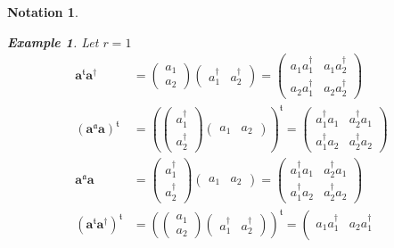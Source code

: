 \documentclass[aps, preprint]{revtex4}
\newtheorem{example}[theorem]{Example}
\newtheorem{notation}[theorem]{Notation}
\begin{document}
\begin{notation}
\begin{example}
Let $r =1$
\begin{align}\mathbf{a}^{\mathfrak{t}} \mathbf{a}^{ \dag } &  =\left (\begin{array}{c}a_{1} \\
a_{2}\end{array}\right ) \left (\begin{array}{cc}a_{1}^{ \dag } & a_{2}^{ \dag }\end{array}\right ) =\left (\begin{array}{cc}a_{1} a_{1}^{ \dag } & a_{1} a_{2}^{ \dag } \\
a_{2} a_{1}^{ \dag } & a_{2} a_{2}^{ \dag }\end{array}\right ) \\
\left (\mathbf{a}^{\mathfrak{a}} \mathbf{a}\right )^{\mathfrak{t}} &  =\left (\left (\begin{array}{c}a_{1}^{ \dag } \\
a_{2}^{ \dag }\end{array}\right ) \left (\begin{array}{cc}a_{1} & a_{2}\end{array}\right )\right )^{\mathfrak{t}} =\left (\begin{array}{cc}a_{1}^{ \dag } a_{1} & a_{2}^{ \dag } a_{1} \\
a_{1}^{ \dag } a_{2} & a_{2}^{ \dag } a_{2}\end{array}\right ) \\
\mathbf{a}^{\mathfrak{a}} \mathbf{a} &  =\left (\begin{array}{c}a_{1}^{ \dag } \\
a_{2}^{ \dag }\end{array}\right ) \left (\begin{array}{cc}a_{1} & a_{2}\end{array}\right ) =\left (\begin{array}{cc}a_{1}^{ \dag } a_{1} & a_{2}^{ \dag } a_{1} \\
a_{1}^{ \dag } a_{2} & a_{2}^{ \dag } a_{2}\end{array}\right ) \\
\left (\mathbf{a}^{\mathfrak{t}} \mathbf{a}^{ \dag }\right )^{\mathfrak{t}} &  =\left (\left (\begin{array}{c}a_{1} \\
a_{2}\end{array}\right ) \left (\begin{array}{cc}a_{1}^{ \dag } & a_{2}^{ \dag }\end{array}\right )\right )^{\mathfrak{t}} =\left (\begin{array}{cc}a_{1} a_{1}^{ \dag } & a_{2} a_{1}^{ \dag } \\

\end{array}
\end{align}
\end{example}
\end{notation}
\end{document}
